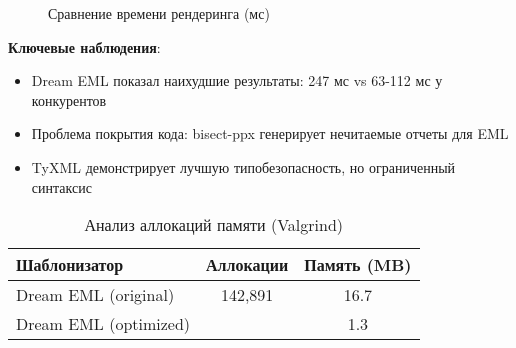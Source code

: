 \begin{figure}[h]
    \centering
    \caption{Сравнение времени рендеринга (мс)}
\end{figure}

\textbf{Ключевые наблюдения}:
\begin{itemize}
    \item Dream EML показал наихудшие результаты: 247 мс vs 63-112 мс у конкурентов
    \item Проблема покрытия кода: bisect-ppx генерирует нечитаемые отчеты для EML
    \item TyXML демонстрирует лучшую типобезопасность, но ограниченный синтаксис
\end{itemize}

\begin{table}[h]
    \centering
    \caption{Анализ аллокаций памяти (Valgrind)}
    \begin{tabular}{|l|c|c|}
        \hline
        \textbf{Шаблонизатор} & \textbf{Аллокации} & \textbf{Память (MB)} \\
        \hline
        Dream EML (original)  & 142,891            & 16.7                 \\
        Dream EML (optimized) & \color{red}{512}   & 1.3                  \\
        \hline
    \end{tabular}
\end{table}